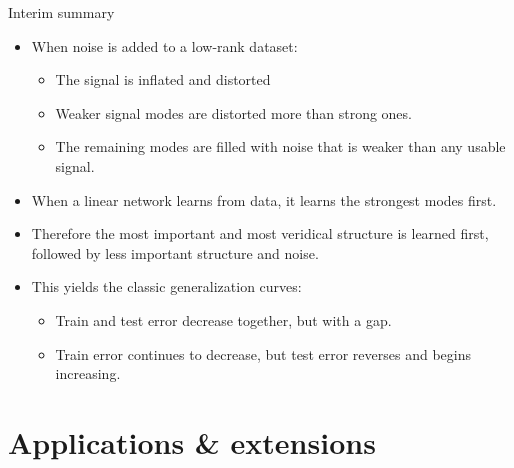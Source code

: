 \documentclass{beamer}
\begin{document}
\begin{frame}{Interim summary}
\begin{itemize}[<+->]
\item When noise is added to a low-rank dataset: 
    \begin{itemize}
    \item The signal is inflated and distorted
    \item Weaker signal modes are distorted more than strong ones.
    \item The remaining modes are filled with noise that is weaker than any usable signal.  
    \end{itemize}
\item When a linear network learns from data, it learns the strongest modes first.
\item Therefore the most important and most veridical structure is learned first, followed by less important structure and noise.
\item This yields the classic generalization curves:
    \begin{itemize}
    \item Train and test error decrease together, but with a gap. 
    \item Train error continues to decrease, but test error reverses and begins increasing. 
    \end{itemize}
\end{itemize}
\end{frame}

\section{Applications \& extensions}
\end{document}
